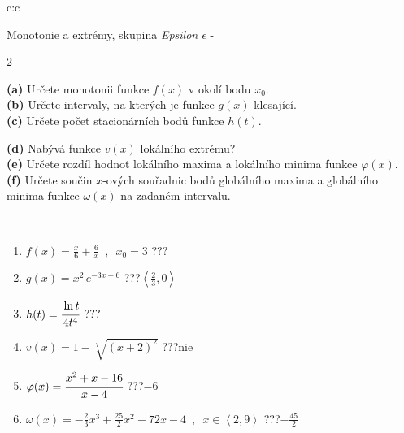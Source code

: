 \documentclass[10pt]{report}
\begin{document}
\newpage
\thispagestyle{empty}
\begin{tabular}{c:c}
\begin{minipage}[c][104.5mm][t]{0.5\linewidth}
\begin{center}
\vspace{7mm}
{\huge Monotonie a extrémy, skupina \textit{Epsilon $\epsilon$} -}\\[5mm]
\begin{minipage}{0.95\linewidth}
\begin{center}
{\small \begin{multicols}{2} \raggedright
\textbf{(a)} Určete monotonii funkce \(f(x)\) v okolí bodu \(x_0\). \\[1mm]
\textbf{(b)} Určete intervaly, na kterých je funkce \(g(x)\) klesající. \\[1mm]
\textbf{(c)} Určete počet stacionárních bodů funkce \(h(t)\). \par \columnbreak
\textbf{(d)} Nabývá funkce \(v(x)\) lokálního extrému? \\[1mm]
\textbf{(e)} Určete rozdíl hodnot lokálního maxima a lokálního minima funkce \(\varphi(x)\). \\[1mm]
\textbf{(f)} Určete součin \(x\)-ových souřadnic bodů globálního maxima a globálního minima funkce \(\omega(x)\) na zadaném intervalu. \\[1mm]
\end{multicols}
}
\end{center}
\end{minipage}
\\[4mm]
\begin{minipage}{0.79\linewidth}
\begin{center}
\begin{varwidth}{\linewidth}
\begin{enumerate}
\normalsize
\item $f(x)=\frac{x}{6}+\frac{6}{x} \enspace , \enspace x_0=3$\quad \dotfill\; ???\;\dotfill \quad {}
\item $g(x)=x^2\, e^{-3x+6}$\quad \dotfill\; ???\;\dotfill \quad $\left\langle\frac{2}{3} , 0\right\rangle$
\item $h(t)=\cfrac{\ln t}{4t^4}$\quad \dotfill\; ???\;\dotfill {}
\item $v(x)=1-\sqrt[7]{(x+2)^2}$\quad \dotfill\; ???\;\dotfill \quad $\text{nie}$
\item $\varphi(x)=\cfrac{x^2+x-16}{x-4}$\quad \dotfill\; ???\;\dotfill \quad $-6$
\item $\omega(x)=-\frac{2}{3}x^3+\frac{25}{2}x^2-72x-4 \enspace , \enspace x\in\left\langle2 , 9\right\rangle$\quad \dotfill\; ???\;\dotfill \quad $-\frac{45}{2}$

\end{enumerate}
\end{varwidth}
\end{center}
\end{minipage}
\end{center}
\end{minipage}
\end{tabular}
\end{document}
